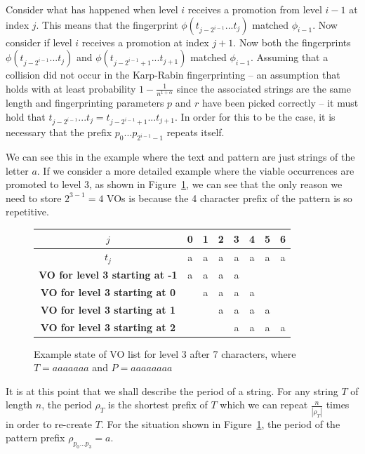 \documentclass[ %
                    author={Dominic Joseph Moylett},
                    degree={MEng},
                     title={Dictionary Matching with Fingerprints},
                  subtitle={An Empirical Analysis},
                      type={research},
                      year={2015} ]{dissertation}
\begin{document}
Consider what has happened when level $i$ receives a promotion from level $i-1$ at index $j$. This means that the fingerprint $\phi(t_{j - 2^{i-1}}...t_j)$ matched $\phi_{i-1}$. Now consider if level $i$ receives a promotion at index $j+1$. Now both the fingerprints $\phi(t_{j - 2^{i-1}}...t_j)$ and $\phi(t_{j - 2^{i-1} + 1}...t_{j + 1})$ matched $\phi_{i-1}$. Assuming that a collision did not occur in the Karp-Rabin fingerprinting  --  an assumption that holds with at least probability $1 - \frac{1}{n^{1 + \alpha}}$ since the associated strings are the same length and fingerprinting parameters $p$ and $r$ have been picked correctly  --  it must hold that $t_{j - 2^{i-1}}...t_j = t_{j - 2^{i-1} + 1}...t_{j + 1}$. In order for this to be the case, it is necessary that the prefix $p_0...p_{2^{i-1} - 1}$ repeats itself.

We can see this in the example where the text and pattern are just strings of the letter $a$. If we consider a more detailed example where the viable occurrences are promoted to level 3, as shown in Figure~\ref{fig:pp-level-3}, we can see that the only reason we need to store $2^{3-1} = 4$ VOs is because the 4 character prefix of the pattern is so repetitive.

\begin{figure}[t]
\centering
\begin{tabular}{|c|c c c c c c c|}
  \hline
  $j$ & 0 & 1 & 2 & 3 & 4 & 5 & 6 \\
  \hline
  $t_j$ & a & a & a & a & a & a & a \\
  \hline
  \textbf{VO for level 3 starting at -1} & a & a & a & a &  &  &  \\
  \hline
  \textbf{VO for level 3 starting at 0} &  & a & a & a & a &  &  \\
  \hline
  \textbf{VO for level 3 starting at 1} &  &  & a & a & a & a &  \\
  \hline
  \textbf{VO for level 3 starting at 2} &  &  &  & a & a & a & a \\
  \hline
\end{tabular}
\caption{Example state of VO list for level 3 after 7 characters, where $T = aaaaaaa$ and $P = aaaaaaaa$}
\label{fig:pp-level-3}
\end{figure}

It is at this point that we shall describe the period of a string. For any string $T$ of length $n$, the period $\rho_T$ is the shortest prefix of $T$ which we can repeat $\frac{n}{|\rho_T|}$ times in order to re-create $T$. For the situation shown in Figure~\ref{fig:pp-level-3}, the period of the pattern prefix $\rho_{p_0...p_3} = a$.
\end{document}
